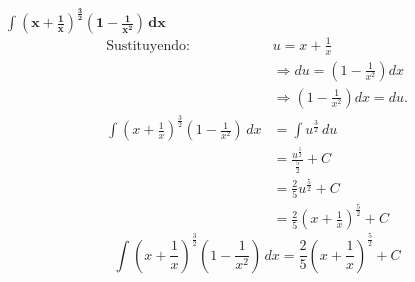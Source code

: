 $\displaystyle \mathbf{\int \left(x + \frac{1}{x}\right)^{\frac{3}{2}} \left(1 - \frac{1}{x^2}\right) \, dx}$
\nopagebreak
\begin{align*}
\text{Sustituyendo: } &u = x + \frac{1}{x} \\
&\Rightarrow du = \left(1 - \frac{1}{x^2}\right) dx \\
&\Rightarrow \left(1 - \frac{1}{x^2}\right) dx = du. \\[6pt]
\int \left(x + \frac{1}{x}\right)^{\frac{3}{2}} \left(1 - \frac{1}{x^2}\right) \, dx
&= \int u^{\frac{3}{2}} \, du \\[6pt]
&= \frac{u^{\frac{5}{2}}}{\frac{5}{2}} + C \\[6pt]
&= \frac{2}{5} u^{\frac{5}{2}} + C \\[6pt]
&= \frac{2}{5} \left(x + \frac{1}{x}\right)^{\frac{5}{2}} + C
\end{align*}
\[
\boxed{\displaystyle \int 
\left(x + \frac{1}{x}\right)^{\frac{3}{2}} \left(1 - \frac{1}{x^2}\right) \, dx 
= \frac{2}{5} \left(x + \frac{1}{x}\right)^{\frac{5}{2}} + C
}
\]
